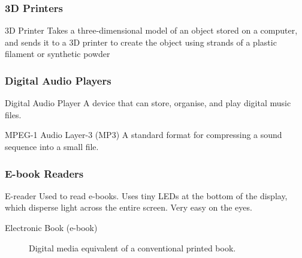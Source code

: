 \documentclass[\main/notes.tex]{subfiles}
\begin{document}
				\subsubsection{3D Printers}
					\begin{definition}{3D Printer}
						Takes a three-dimensional model of an object stored on a computer, and sends it to a 3D printer to create the object using strands of a plastic filament or synthetic powder
					\end{definition}
				\subsubsection{Digital Audio Players}
					\begin{definition}{Digital Audio Player}
						A device that can store, organise, and play digital music files.
					\end{definition}
					\begin{definition}{MPEG-1 Audio Layer-3 (MP3)}
						A standard format for compressing a sound sequence into a small file.
					\end{definition}
				\subsubsection{E-book Readers}
					\begin{definition}{E-reader}
						Used to read e-books. Uses tiny LEDs at the bottom of the display, which disperse light across the entire screen. Very easy on the eyes.
						\begin{description}
							\item[Electronic Book (e-book)] Digital media equivalent of a conventional printed book.
						\end{description}
					\end{definition}
	\vbox{}
\end{document}
